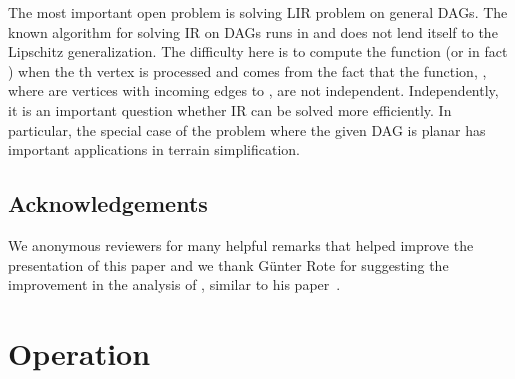 \documentclass[11pt]{article}
\begin{document}
The most important open problem is solving LIR problem on general DAGs. The known algorithm for solving IR on DAGs runs in  and does not lend itself to the Lipschitz generalization. The difficulty here is to compute the function  (or in fact ) when the th vertex is processed and comes from the fact that the  function, , where  are vertices with incoming edges to , are not independent. Independently, it is an important question whether IR can be solved more efficiently. In particular, the special case of the problem where the given DAG is planar has important applications in terrain simplification. 

\subsection*{Acknowledgements}
We anonymous reviewers for many helpful remarks that helped improve the presentation of this paper and we thank G\"unter Rote for suggesting the improvement in the analysis of , similar to his paper~\cite{Rote}.  




\newpage

\appendix

\section{ Operation}
\end{document}
